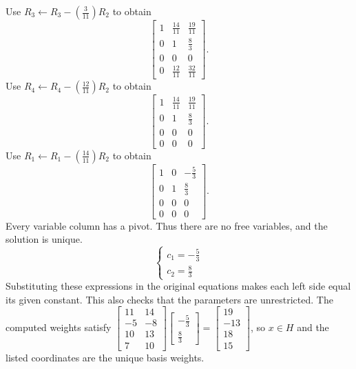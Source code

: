 Use $R_{3}\leftarrow R_{3}-(\frac{3}{11})R_{2}$ to obtain
\[ \left[\begin{array}{rr|r}1&\frac{14}{11}&\frac{19}{11}\\0&1&\frac{8}{3}\\0&0&0\\0&\frac{12}{11}&\frac{32}{11}\end{array}\right].\]
Use $R_{4}\leftarrow R_{4}-(\frac{12}{11})R_{2}$ to obtain
\[ \left[\begin{array}{rr|r}1&\frac{14}{11}&\frac{19}{11}\\0&1&\frac{8}{3}\\0&0&0\\0&0&0\end{array}\right].\]
Use $R_{1}\leftarrow R_{1}-(\frac{14}{11})R_{2}$ to obtain
\[ \left[\begin{array}{rr|r}1&0&- \frac{5}{3}\\0&1&\frac{8}{3}\\0&0&0\\0&0&0\end{array}\right].\]
Every variable column has a pivot. Thus there are no free variables, and the solution is unique.
\[ \begin{cases}c_{1}=- \frac{5}{3}\\c_{2}=\frac{8}{3}\end{cases}\]
Substituting these expressions in the original equations makes each left side equal its given constant. This also checks that the parameters are unrestricted.
The computed weights satisfy $\left[\begin{array}{rr}11&14\\-5&-8\\10&13\\7&10\end{array}\right]\left[\begin{array}{r}- \frac{5}{3}\\\frac{8}{3}\end{array}\right]=\left[\begin{array}{r}19\\-13\\18\\15\end{array}\right]$, so $x\in H$ and the listed coordinates are the unique basis weights.

